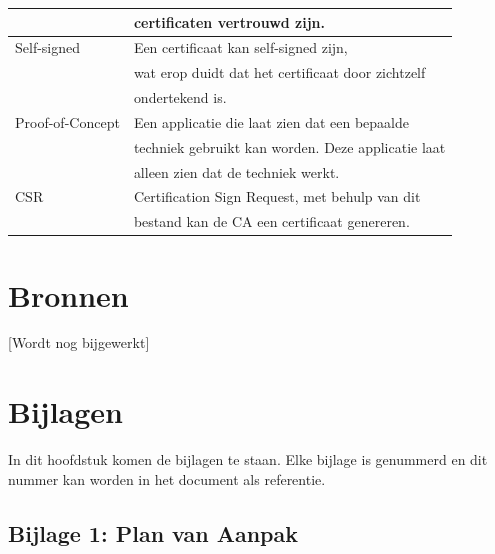 \documentclass[]{article}
\begin{document}
\begin{longtable}{|| l | l ||}
                     & certificaten vertrouwd  zijn.                        \\\hline
    Self-signed      & Een certificaat kan self-signed zijn,                \\
                     & wat erop duidt dat het certificaat door zichtzelf    \\
                     & ondertekend is.                                      \\\hline
    Proof-of-Concept & Een applicatie die laat zien dat een bepaalde        \\
                     & techniek gebruikt kan worden. Deze applicatie laat   \\
                     & alleen zien dat de techniek werkt.                   \\\hline
    CSR              & Certification Sign Request, met behulp van dit       \\
                     & bestand kan de CA een certificaat genereren.         \\\hline
\end{longtable}

\newpage
\section{Bronnen}
[Wordt nog bijgewerkt]

\newpage
\section{Bijlagen}

In dit hoofdstuk komen de bijlagen te staan. Elke bijlage is genummerd en
dit nummer kan worden in het document als referentie.

\subsection{Bijlage 1: Plan van Aanpak}

\newpage
\end{document}
